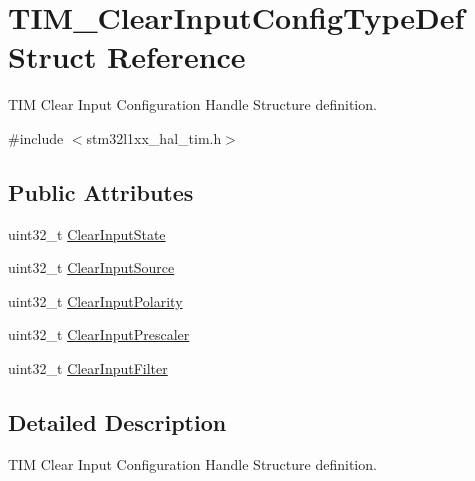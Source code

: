 \hypertarget{struct_t_i_m___clear_input_config_type_def}{\section{T\-I\-M\-\_\-\-Clear\-Input\-Config\-Type\-Def Struct Reference}
\label{struct_t_i_m___clear_input_config_type_def}
}


T\-I\-M Clear Input Configuration Handle Structure definition.  




{\ttfamily \#include $<$stm32l1xx\-\_\-hal\-\_\-tim.\-h$>$}

\subsection*{Public Attributes}
\begin{DoxyCompactItemize}
\item 
uint32\-\_\-t \hyperlink{struct_t_i_m___clear_input_config_type_def_a01d4b91dd297c4f0582a4d9179abf32f}{Clear\-Input\-State}
\item 
uint32\-\_\-t \hyperlink{struct_t_i_m___clear_input_config_type_def_a776d2f14021a82e022468fd46594b8a0}{Clear\-Input\-Source}
\item 
uint32\-\_\-t \hyperlink{struct_t_i_m___clear_input_config_type_def_a49dbc65edc5316822fcabd61cc8409de}{Clear\-Input\-Polarity}
\item 
uint32\-\_\-t \hyperlink{struct_t_i_m___clear_input_config_type_def_a509cecb64fec71391ddc8b4703e09cfe}{Clear\-Input\-Prescaler}
\item 
uint32\-\_\-t \hyperlink{struct_t_i_m___clear_input_config_type_def_a6d2e06a970e30aaf4f8a6091e443eecf}{Clear\-Input\-Filter}
\end{DoxyCompactItemize}


\subsection{Detailed Description}
T\-I\-M Clear Input Configuration Handle Structure definition. 

